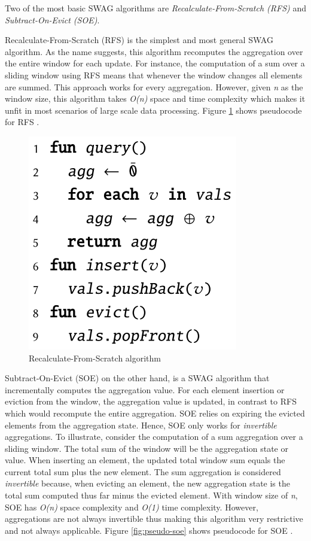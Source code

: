 Two of the most basic SWAG algorithms are \textit{Recalculate-From-Scratch (RFS)} and \textit{Subtract-On-Evict (SOE)}.

Recalculate-From-Scratch (RFS) is the simplest and most general SWAG algorithm. As the name suggests, this algorithm recomputes the aggregation over the entire window for each update. For instance, the computation of a sum over a sliding window using RFS means that whenever the window changes all elements are summed. This approach works for every aggregation. However, given \textit{n} as the window size, this algorithm takes \textit{O(n)} space and time complexity which makes it unfit in most scenarios of large scale data processing. Figure \ref{fig:pseudo-rfs} shows pseudocode for RFS \cite{Tangwongsan-Sliding-Window-Aggregation-Algorithms}.
  

\begin{figure}[!htb]
    \begin{center}
      \includegraphics[scale=0.45]{figures/rfs.png}
      \caption{Recalculate-From-Scratch algorithm}
      \label{fig:pseudo-rfs}
    \end{center}
\end{figure}
 
Subtract-On-Evict (SOE) on the other hand, is a SWAG algorithm that incrementally computes the aggregation value. For each element insertion or eviction from the window, the aggregation value is updated, in contrast to RFS which would recompute the entire aggregation. SOE relies on expiring the evicted elements from the aggregation state. Hence, SOE only works for \textit{invertible} aggregations. To illustrate, consider the computation of a sum aggregation over a sliding window. The total sum of the window will be the aggregation state or value. When inserting an element, the updated total window sum equals the current total sum plus the new element. The sum aggregation is considered \textit{invertible} because, when evicting an element, the new aggregation state is the total sum computed thus far minus the evicted element. With window size of \textit{n}, SOE has \textit{O(n)} space complexity and \textit{O(1)} time complexity. However, aggregations are not always invertible thus making this algorithm very restrictive and not always applicable. Figure \ref{fig:pseudo-soe} shows pseudocode for SOE \cite{Tangwongsan-Sliding-Window-Aggregation-Algorithms}.

